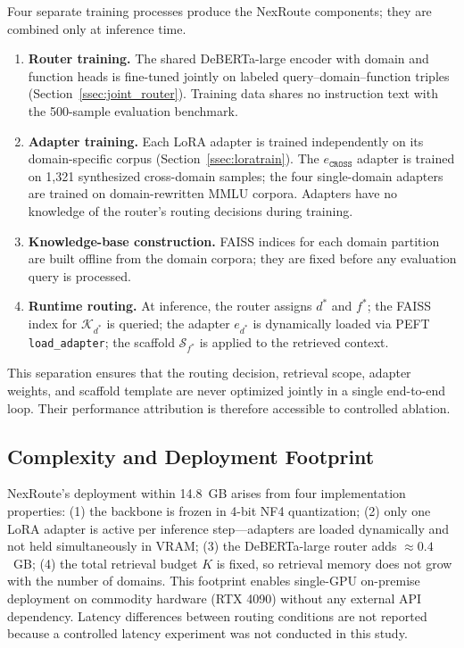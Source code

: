 \documentclass[a4paper,fleql,doubleblind]{cas-sc}
\begin{document}
Four separate training processes produce the NexRoute components; they are
combined only at inference time.

\begin{enumerate}
\item \textbf{Router training.} The shared DeBERTa-large encoder with domain and
function heads is fine-tuned jointly on labeled query--domain--function triples
(Section~\ref{ssec:joint_router}). Training data shares no instruction text
with the 500-sample evaluation benchmark.
\item \textbf{Adapter training.} Each LoRA adapter is trained independently on
its domain-specific corpus (Section~\ref{ssec:loratrain}). The $e_\texttt{CROSS}$
adapter is trained on 1,321 synthesized cross-domain samples; the four
single-domain adapters are trained on domain-rewritten MMLU corpora. Adapters
have no knowledge of the router's routing decisions during training.
\item \textbf{Knowledge-base construction.} FAISS indices for each domain
partition are built offline from the domain corpora; they are fixed before
any evaluation query is processed.
\item \textbf{Runtime routing.} At inference, the router assigns $d^*$ and $f^*$;
the FAISS index for $\mathcal{K}_{d^*}$ is queried; the adapter $e_{d^*}$ is
dynamically loaded via PEFT \texttt{load\_adapter}; the scaffold $\mathcal{S}_{f^*}$
is applied to the retrieved context.
\end{enumerate}

This separation ensures that the routing decision, retrieval scope, adapter weights,
and scaffold template are never optimized jointly in a single end-to-end loop.
Their performance attribution is therefore accessible to controlled ablation.

\subsection{Complexity and Deployment Footprint}
\label{ssec:complexity}

NexRoute's deployment within 14.8~GB arises from four implementation properties:
(1) the backbone is frozen in 4-bit NF4 quantization;
(2) only one LoRA adapter is active per inference step---adapters are loaded
dynamically and not held simultaneously in VRAM;
(3) the DeBERTa-large router adds ${\approx}0.4$~GB;
(4) the total retrieval budget $K$ is fixed, so retrieval memory does not
grow with the number of domains.
This footprint enables single-GPU on-premise deployment on commodity hardware
(RTX 4090) without any external API dependency.
Latency differences between routing conditions are not reported because a
controlled latency experiment was not conducted in this study.
\end{document}
